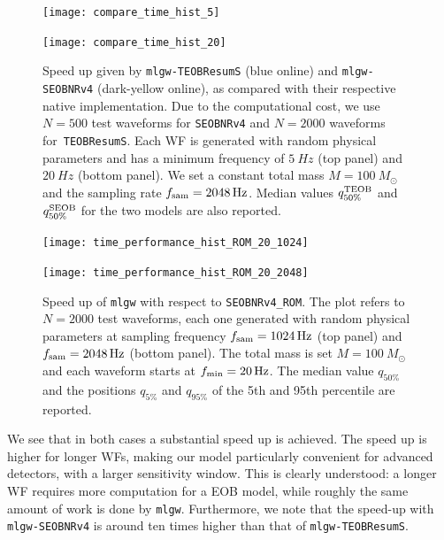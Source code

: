 \newcommand{\factor}{.9}
\begin{figure}
	\centering
	\begin{minipage}{\factor\linewidth}
	    \texttt{[image: compare\_time\_hist\_5]}
	\end{minipage}\hfill
	\begin{minipage}{\factor\linewidth}
	    \texttt{[image: compare\_time\_hist\_20]}
	\end{minipage}

	\caption{
Speed up given by \texttt{mlgw-TEOBResumS} (blue online) and \texttt{mlgw-SEOBNRv4} (dark-yellow online), 
as compared with their respective native implementation. 
Due to the computational cost, we use $N=500$ test waveforms for \texttt{SEOBNRv4} 
and $N=2000$ waveforms for~\texttt{TEOBResumS}. Each WF is generated with random physical 
parameters and has a minimum frequency of $\SI{5}{Hz}$ (top panel) and $\SI{20}{Hz}$ (bottom panel).
We set a constant total mass $M=\SI{100}{M_\odot}$ and the sampling rate $f_{\rm sam} = \SI{2048}{Hz}$.
Median values $q^{\rm TEOB}_{50\%}$ and $q^{\rm SEOB}_{50\%}$ for the two models are also reported.
}
	\label{fig:time_performance_hist}
\end{figure}
\begin{figure}
	\centering
	\begin{minipage}{\factor\linewidth}
	    \texttt{[image: time\_performance\_hist\_ROM\_20\_1024]}
	\end{minipage}\hfill
	\begin{minipage}{\factor\linewidth}
	    \texttt{[image: time\_performance\_hist\_ROM\_20\_2048]}
	\end{minipage}

	\caption{
	Speed up of \texttt{mlgw} with respect to \texttt{SEOBNRv4\_ROM}.
	The plot refers to  $N=2000$ test waveforms, each one generated with random physical 
	parameters at sampling frequency $ f_{\rm sam}=\SI{1024}{Hz}$ (top panel) 
	and $f_{\rm sam}=\SI{2048}{Hz}$ (bottom panel). The total mass is set $M=\SI{100}{M_\odot}$ 
	and each waveform starts at $f_{\rm min} = \SI{20}{Hz}$.
	The median value $q_{50\%}$ and the positions $q_{5\%}$ and $q_{95\%}$ of the 5th and 95th percentile are reported.
}
	\label{fig:time_performance_hist_ROM}
\end{figure}

We see that in both cases a substantial speed up is achieved. The speed up is higher for longer WFs, 
making our model particularly convenient 
for advanced detectors, with a larger sensitivity window.
This is clearly understood: a longer WF requires more computation for a EOB model, while 
roughly the same amount of work is done by \texttt{mlgw}.
Furthermore, we note that the speed-up with \texttt{mlgw-SEOBNRv4} is around ten times 
higher than that of \texttt{mlgw-TEOBResumS}. 

